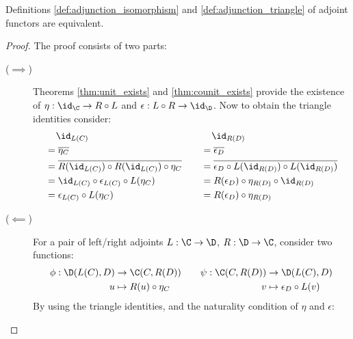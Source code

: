 \begin{theorem}
  Definitions \ref{def:adjunction_isomorphism} and \ref{def:adjunction_triangle}
  of adjoint functors are equivalent.

  \begin{proof}
    The proof consists of two parts:
    \begin{description}
      \item[($\implies$)] Theorems \ref{thm:unit_exists} and
        \ref{thm:counit_exists} provide the existence of $\eta: \id_\C \to
        R\circ L$ and $\epsilon: L\circ R \to \id_\D$. Now to obtain the
        triangle identities consider:
        \[
          \begin{aligned}
              &\phantom{=\ }\id_{L(C)}\\
              &= \overline{\eta_C}\\
              &= \overline{R(\id_{L(C)})\circ R(\id_{L(C)})\circ \eta_C}\\
              &= \id_{L(C)} \circ \epsilon_{L(C)}\circ L(\eta_C)\\
              &= \epsilon_{L(C)}\circ L(\eta_C)
          \end{aligned}
          \qquad
          \begin{aligned}
              &\phantom{=\ }\id_{R(D)}\\
              &= \overline{\epsilon_D}\\
              &= \overline{\epsilon_D
                \circ L(\id_{R(D)})\circ L(\id_{R(D)})}\\
              &= R(\epsilon_D) \circ \eta_{R(D)} \circ \id_{R(D)}\\
              &= R(\epsilon_D) \circ \eta_{R(D)}
          \end{aligned}
        \]
      \item[($\impliedby$)] For a pair of left/right adjoints $L:\C\to \D$,
        $R:\D\to \C$, consider two functions:
        \[
          \begin{aligned}
            \phi: \D(L(C), D) &\to \C(C, R(D))\\
            u &\mapsto R(u)\circ \eta_C
          \end{aligned}
          \qquad
          \begin{aligned}
            \psi: \C(C, R(D)) &\to \D(L(C), D)\\
            v &\mapsto \epsilon_D \circ L(v)
          \end{aligned}
        \]
        By using the triangle identities, and the naturality condition of $\eta$
        and $\epsilon$:


\end{description}
\end{proof}
\end{theorem}
